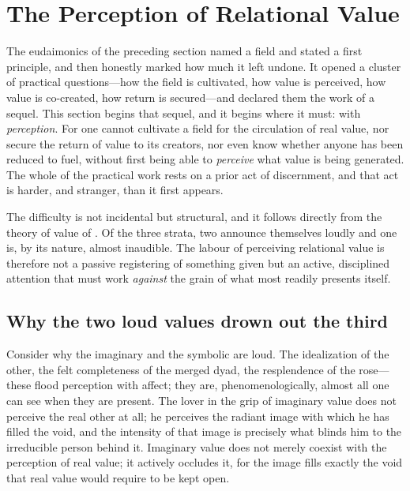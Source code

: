 \section{The Perception of Relational Value}
\label{p09:sec:perception}

\noindent
The eudaimonics of the preceding section named a field and stated a first principle, and then honestly marked how much it left undone. It opened a cluster of practical questions---how the field is cultivated, how value is perceived, how value is co-created, how return is secured---and declared them the work of a sequel. This section begins that sequel, and it begins where it must: with \emph{perception}. For one cannot cultivate a field for the circulation of real value, nor secure the return of value to its creators, nor even know whether anyone has been reduced to fuel, without first being able to \emph{perceive} what value is being generated. The whole of the practical work rests on a prior act of discernment, and that act is harder, and stranger, than it first appears.

The difficulty is not incidental but structural, and it follows directly from the theory of value of . Of the three strata, two announce themselves loudly and one is, by its nature, almost inaudible.  The labour of perceiving relational value is therefore not a passive registering of something given but an active, disciplined attention that must work \emph{against} the grain of what most readily presents itself.

\subsection{Why the two loud values drown out the third}
\label{p09:sec:loud-values}

Consider why the imaginary and the symbolic are loud.  The idealization of the other, the felt completeness of the merged dyad, the resplendence of the rose---these flood perception with affect; they are, phenomenologically, almost all one can see when they are present. The lover in the grip of imaginary value does not perceive the real other at all; he perceives the radiant image with which he has filled the void, and the intensity of that image is precisely what blinds him to the irreducible person behind it. Imaginary value does not merely coexist with the perception of real value; it actively occludes it, for the image fills exactly the void that real value would require to be kept open.

